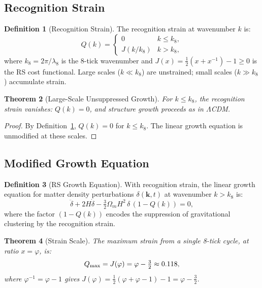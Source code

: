 \documentclass[12pt,a4paper]{article}
\newtheorem{theorem}{Theorem}[section]
\theoremstyle{definition}
\newtheorem{definition}[theorem]{Definition}
\theoremstyle{remark}
\begin{document}
\subsection{Recognition Strain}

\begin{definition}[Recognition Strain]
\label{def:strain}
The recognition strain at wavenumber $k$ is:
\[
  Q(k) = \begin{cases} 0 & k \leq k_8, \\ J(k/k_8) & k > k_8, \end{cases}
\]
where $k_8 = 2\pi/\lambda_8$ is the 8-tick wavenumber and
$J(x) = \tfrac{1}{2}(x + x^{-1}) - 1 \geq 0$ is the RS cost
functional.  Large scales ($k \ll k_8$) are unstrained; small scales
($k \gg k_8$) accumulate strain.
\end{definition}

\begin{theorem}[Large-Scale Unsuppressed Growth]
\label{thm:large-scale}
For $k \leq k_8$, the recognition strain vanishes: $Q(k) = 0$, and
structure growth proceeds as in $\Lambda$CDM.
\end{theorem}

\begin{proof}
By Definition~\ref{def:strain}, $Q(k) = 0$ for $k \leq k_8$.  The
linear growth equation is unmodified at these scales.
\end{proof}

\subsection{Modified Growth Equation}

\begin{definition}[RS Growth Equation]
With recognition strain, the linear growth equation for matter density
perturbations $\delta(\mathbf{k},t)$ at wavenumber $k > k_8$ is:
\begin{equation}
\label{eq:growth}
  \ddot\delta + 2H\dot\delta - \tfrac{3}{2}\Omega_m H^2\,\delta\,
  (1 - Q(k)) = 0,
\end{equation}
where the factor $(1 - Q(k))$ encodes the suppression of gravitational
clustering by the recognition strain.
\end{definition}

\begin{theorem}[Strain Scale]
\label{thm:strain-scale}
The maximum strain from a single 8-tick cycle, at ratio $x = \varphi$,
is:
\begin{equation}
  Q_{\rm max} = J(\varphi) = \varphi - \tfrac{3}{2} \approx 0.118,
\end{equation}
where $\varphi^{-1} = \varphi - 1$ gives $J(\varphi) = \tfrac{1}{2}
(\varphi + \varphi - 1) - 1 = \varphi - \tfrac{3}{2}$.
\end{theorem}
\end{document}

